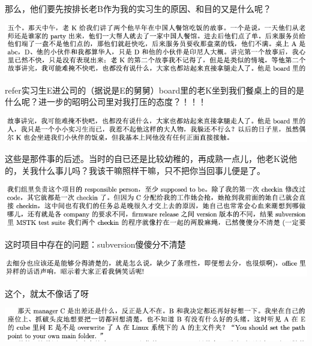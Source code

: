\documentclass[9pt, b5paper]{article}
\begin{document}
那么，他们要先按排长老B作为我的实习生的原因、和目的又是什么呢？

\begin{center}
\includegraphics[width=.9\linewidth]{./pic/backups_plans_20210507_105100.png}
\end{center}

refer实习生E进公司的（据说是E的舅舅）board里的老K坐到我们餐桌上的目的是什么呢？进一步的昭明公司里对我打压的态度？！！！

\begin{center}
\includegraphics[width=.9\linewidth]{./pic/backups_plans_20210507_105255.png}
\end{center}

这些是那件事的后述。当时的自已还是比较幼稚的，再成熟一点儿，他老K说他的，关我什么事儿吗？我该干嘛照样干嘛，只不把你当回事儿便是了。 

\begin{center}
\includegraphics[width=.9\linewidth]{./pic/backups_plans_20210507_093941.png}
\end{center}

这时项目中存在的问题：subversion傻傻分不清楚

\begin{center}
\includegraphics[width=.9\linewidth]{./pic/backups_plans_20210507_094042.png}
\end{center}

这个，就太不像话了呀

\begin{center}
\includegraphics[width=.9\linewidth]{./pic/backups_plans_20210507_094121.png}
\end{center}
\end{document}
